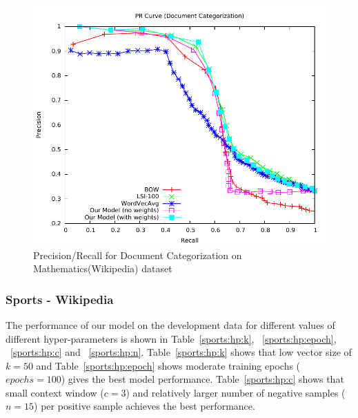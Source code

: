 \begin{figure}[tb]
\centering
        \includegraphics[width=0.8\columnwidth]{figs/pr/mathematics-cs-scala.pdf}
        \vskip -4mm
    \caption{ Precision/Recall for Document Categorization on Mathematics(Wikipedia) dataset}
    \label{fig:pr:mathematics:cs} 
\end{figure}

\subsubsection{Sports - Wikipedia}
The performance of our model on the development data for different values of different hyper-parameters is shown in Table~\ref{sports:hp:k}, ~\ref{sports:hp:epoch}, ~\ref{sports:hp:c} and ~\ref{sports:hp:n}. Table~\ref{sports:hp:k} shows that low vector size of $k = 50$ and Table~\ref{sports:hp:epoch} shows moderate training epochs ($epochs = 100$) gives the best model performance. 
Table~\ref{sports:hp:c} shows that small context window ($c = 3$) and relatively larger number of negative samples ($n = 15$) per positive sample achieves the best performance.

